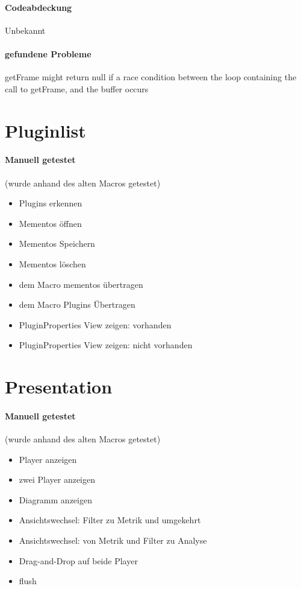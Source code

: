\paragraph*{Codeabdeckung}
Unbekannt

\paragraph*{gefundene Probleme}
getFrame might return null if a race condition between the loop containing the call to getFrame, and the buffer occurs
\section{Pluginlist}
\paragraph{Manuell getestet}
(wurde anhand des alten Macros getestet)
\begin{itemize}
\item Plugins erkennen
\item Mementos öffnen
\item Mementos Speichern
\item Mementos löschen
\item dem Macro mementos übertragen
\item dem Macro Plugins Übertragen
\item PluginProperties View zeigen: vorhanden
\item PluginProperties View zeigen: nicht vorhanden
\end{itemize}


\section{Presentation}
\paragraph{Manuell getestet}
(wurde anhand des alten Macros getestet)
\begin{itemize}
\item Player anzeigen
\item zwei Player anzeigen
\item Diagramm anzeigen
\item Ansichtswechsel: Filter zu Metrik und umgekehrt
\item Ansichtswechsel: von Metrik und Filter zu Analyse
\item Drag-and-Drop auf beide Player
\item flush
\end{itemize}

